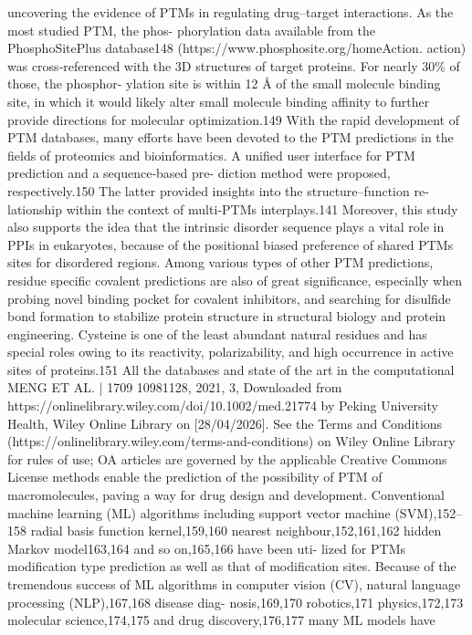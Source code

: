 uncovering the evidence of PTMs in regulating drug–target interactions. As the most studied PTM, the phos-
phorylation data available from the PhosphoSitePlus database148 (https://www.phosphosite.org/homeAction.
action) was cross‐referenced with the 3D structures of target proteins. For nearly 30\% of those, the phosphor-
ylation site is within 12 Å of the small molecule binding site, in which it would likely alter small molecule binding
affinity to further provide directions for molecular optimization.149
With the rapid development of PTM databases, many efforts have been devoted to the PTM predictions in the
fields of proteomics and bioinformatics. A unified user interface for PTM prediction and a sequence‐based pre-
diction method were proposed, respectively.150 The latter provided insights into the structure–function re-
lationship within the context of multi‐PTMs interplays.141 Moreover, this study also supports the idea that the
intrinsic disorder sequence plays a vital role in PPIs in eukaryotes, because of the positional biased preference of
shared PTMs sites for disordered regions. Among various types of other PTM predictions, residue specific covalent
predictions are also of great significance, especially when probing novel binding pocket for covalent inhibitors, and
searching for disulfide bond formation to stabilize protein structure in structural biology and protein engineering.
Cysteine is one of the least abundant natural residues and has special roles owing to its reactivity, polarizability,
and high occurrence in active sites of proteins.151 All the databases and state of the art in the computational
MENG ET AL.
| 1709
 10981128, 2021, 3, Downloaded from https://onlinelibrary.wiley.com/doi/10.1002/med.21774 by Peking University Health, Wiley Online Library on [28/04/2026]. See the Terms and Conditions (https://onlinelibrary.wiley.com/terms-and-conditions) on Wiley Online Library for rules of use; OA articles are governed by the applicable Creative Commons License
methods enable the prediction of the possibility of PTM of macromolecules, paving a way for drug design and
development.
Conventional machine learning (ML) algorithms including support vector machine (SVM),152–158 radial basis
function kernel,159,160 nearest neighbour,152,161,162 hidden Markov model163,164 and so on,165,166 have been uti-
lized for PTMs modification type prediction as well as that of modification sites. Because of the tremendous
success of ML algorithms in computer vision (CV), natural language processing (NLP),167,168 disease diag-
nosis,169,170 robotics,171 physics,172,173 molecular science,174,175 and drug discovery,176,177 many ML models have
